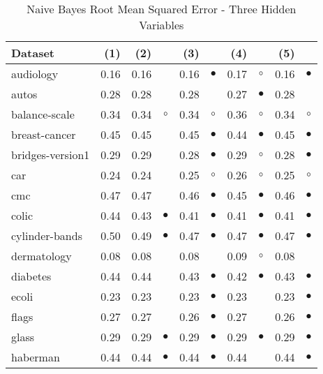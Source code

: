 \newpage
{\centering \footnotesize \begin{longtable}{lrr@{\hspace{0.1cm}}cr@{\hspace{0.1cm}}cr@{\hspace{0.1cm}}cr@{\hspace{0.1cm}}c}
\caption{\label{nbrmse3}Naive Bayes Root Mean Squared Error - Three Hidden Variables}
\\
\hline
Dataset & (1)& (2) & & (3) & & (4) & & (5) & \\
\hline
audiology & 0.16 & 0.16 &            & 0.16 & $\bullet$ & 0.17 &    $\circ$ & 0.16 & $\bullet$\\
autos & 0.28 & 0.28 &            & 0.28 &           & 0.27 &  $\bullet$ & 0.28 &          \\
balance-scale & 0.34 & 0.34 &    $\circ$ & 0.34 &   $\circ$ & 0.36 &    $\circ$ & 0.34 &   $\circ$\\
breast-cancer & 0.45 & 0.45 &            & 0.45 & $\bullet$ & 0.44 &  $\bullet$ & 0.45 & $\bullet$\\
bridges-version1 & 0.29 & 0.29 &            & 0.28 & $\bullet$ & 0.29 &    $\circ$ & 0.28 & $\bullet$\\
car & 0.24 & 0.24 &            & 0.25 &   $\circ$ & 0.26 &    $\circ$ & 0.25 &   $\circ$\\
cmc & 0.47 & 0.47 &            & 0.46 & $\bullet$ & 0.45 &  $\bullet$ & 0.46 & $\bullet$\\
colic & 0.44 & 0.43 &  $\bullet$ & 0.41 & $\bullet$ & 0.41 &  $\bullet$ & 0.41 & $\bullet$\\
cylinder-bands & 0.50 & 0.49 &  $\bullet$ & 0.47 & $\bullet$ & 0.47 &  $\bullet$ & 0.47 & $\bullet$\\
dermatology & 0.08 & 0.08 &            & 0.08 &           & 0.09 &    $\circ$ & 0.08 &          \\
diabetes & 0.44 & 0.44 &            & 0.43 & $\bullet$ & 0.42 &  $\bullet$ & 0.43 & $\bullet$\\
ecoli & 0.23 & 0.23 &            & 0.23 & $\bullet$ & 0.23 &            & 0.23 & $\bullet$\\
flags & 0.27 & 0.27 &            & 0.26 & $\bullet$ & 0.27 &            & 0.26 & $\bullet$\\
glass & 0.29 & 0.29 &  $\bullet$ & 0.29 & $\bullet$ & 0.29 &  $\bullet$ & 0.29 & $\bullet$\\
haberman & 0.44 & 0.44 &  $\bullet$ & 0.44 & $\bullet$ & 0.44 &            & 0.44 & $\bullet$\\

\end{longtable}}

